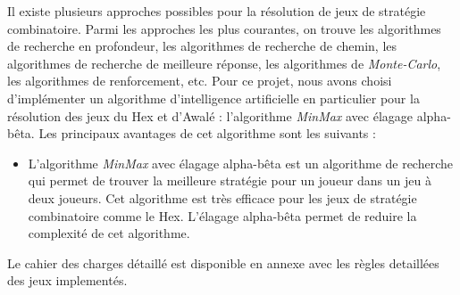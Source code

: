 Il existe plusieurs approches possibles pour la résolution de jeux de stratégie
combinatoire. Parmi les approches les plus courantes, on trouve les algorithmes
de recherche en profondeur, les algorithmes de recherche de chemin, les
algorithmes de recherche de meilleure réponse, les algorithmes de \emph{Monte-Carlo},
les algorithmes de renforcement, etc.
Pour ce projet, nous avons choisi d'implémenter un algorithme d'intelligence artificielle 
en particulier pour la résolution des jeux du Hex et d'Awalé : l'algorithme \emph{MinMax} avec élagage
alpha-bêta.
Les principaux avantages de cet algorithme sont les suivants :
\begin{itemize}
	\item L'algorithme \emph{MinMax} avec élagage alpha-bêta est un algorithme de recherche
	qui permet de trouver la meilleure stratégie pour un joueur dans un jeu à deux
	joueurs. Cet algorithme est très efficace pour les jeux de stratégie combinatoire
	comme le Hex. L'élagage alpha-bêta permet de reduire la complexité de cet algorithme.
\end{itemize}

Le cahier des charges détaillé est disponible en annexe avec les règles detaillées des jeux implementés.

